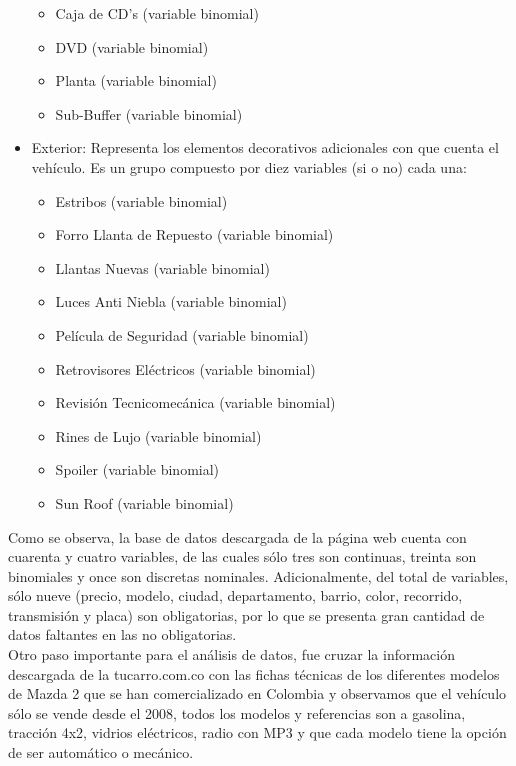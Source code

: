 \documentclass[a4paper]{article}
\begin{document}
\begin{itemize}
\begin{itemize}
\item Caja de CD's (variable binomial)
\item DVD (variable binomial)
\item Planta (variable binomial)
\item Sub-Buffer (variable binomial)
\end{itemize}
\item Exterior: Representa los elementos decorativos adicionales con que cuenta el vehículo. Es un grupo compuesto por diez variables (si o no) cada una:
\begin{itemize}
\item Estribos (variable binomial)
\item Forro Llanta de Repuesto (variable binomial)
\item Llantas Nuevas (variable binomial)
\item Luces Anti Niebla (variable binomial)
\item Película de Seguridad (variable binomial)
\item Retrovisores Eléctricos (variable binomial)
\item Revisión Tecnicomecánica (variable binomial)
\item Rines de Lujo (variable binomial)
\item Spoiler (variable binomial)
\item Sun Roof (variable binomial)
\end{itemize}
\end{itemize}
Como se observa, la base de datos descargada de la página web cuenta con cuarenta y cuatro variables, de las cuales sólo tres son continuas, treinta son binomiales y once son discretas nominales. Adicionalmente, del total de variables,  sólo nueve (precio, modelo, ciudad, departamento, barrio, color, recorrido, transmisión y placa) son obligatorias, por lo que se presenta gran cantidad de datos faltantes en las no obligatorias.\\

Otro paso importante para el análisis de datos, fue cruzar la información descargada de la tucarro.com.co con las fichas técnicas de los diferentes modelos de Mazda 2 que se han comercializado en Colombia y observamos que el vehículo sólo se vende desde el 2008, todos los modelos y referencias son a gasolina, tracción 4x2, vidrios eléctricos, radio con MP3 y que cada modelo tiene la opción de ser automático o mecánico.\\
\end{document}
